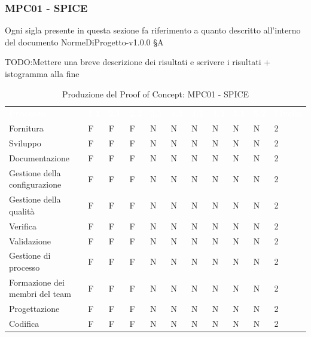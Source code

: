 \subsubsection{MPC01 - SPICE}
Ogni sigla presente in questa sezione fa riferimento a quanto descritto all'interno del documento NormeDiProgetto-v1.0.0 §A

TODO:Mettere una breve descrizione dei risultati e scrivere i risultati + istogramma alla fine 

\begin{table}[H]
        \renewcommand{\arraystretch}{1.5}
        \begin{tabular}{ m{}<{\centering}  m{}<{\centering} m{}<{\centering} m{}<{\centering} m{}<{\centering} m{}<{\centering} m{}<{\centering} m{}<{\centering} m{}<{\centering} m{}<{\centering} m{}<{\centering}}
	\rowcolor{darkblue}
	\textcolor{white}{\textbf{Processo}} &\textcolor{white}{\textbf{1.1}} &\textcolor{white}{\textbf{2.1}} &\textcolor{white}{\textbf{2.2}} &\textcolor{white}{\textbf{3.1}} &\textcolor{white}{\textbf{3.2}} &\textcolor{white}{\textbf{4.1}} &\textcolor{white}{\textbf{4.2}} &\textcolor{white}{\textbf{5.1}} &\textcolor{white}{\textbf{5.2}} &\textcolor{white}{\textbf{Livello}}\\ 

    Fornitura & F & F & F & N & N & N & N & N & N & 2 \\
    Sviluppo & F & F & F & N & N & N & N & N & N & 2 \\
    Documentazione & F & F & F & N & N & N & N & N & N & 2 \\
    Gestione della configurazione & F & F & F & N & N & N & N & N & N & 2 \\
    Gestione della qualità & F & F & F & N & N & N & N & N & N & 2 \\
    Verifica & F & F & F & N & N & N & N & N & N & 2 \\
    Validazione & F & F & F & N & N & N & N & N & N & 2 \\
    Gestione di processo & F & F & F & N & N & N & N & N & N & 2 \\
    Formazione dei membri del team & F & F & F & N & N & N & N & N & N & 2 \\
    Progettazione & F & F & F & N & N & N & N & N & N & 2 \\
    Codifica & F & F & F & N & N & N & N & N & N & 2 \\
        \end{tabular}
\caption{Produzione del Proof of Concept: MPC01 - SPICE}
\end{table}
